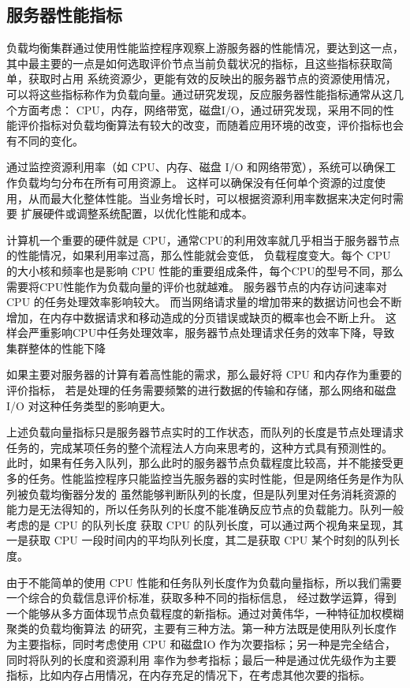 \subsection{服务器性能指标}

负载均衡集群通过使用性能监控程序观察上游服务器的性能情况，要达到这一点，其中最主要的一点是如何选取评价节点当前负载状况的指标，且这些指标获取简单，获取时占用
系统资源少，更能有效的反映出的服务器节点的资源使用情况，可以将这些指标称作为负载向量。通过研究发现，反应服务器性能指标通常从这几个方面考虑：
CPU，内存，网络带宽，磁盘I/O，通过研究发现，采用不同的性能评价指标对负载均衡算法有较大的改变，而随着应用环境的改变，评价指标也会有不同的变化。

通过监控资源利用率（如 CPU、内存、磁盘 I/O 和网络带宽），系统可以确保工作负载均匀分布在所有可用资源上。
这样可以确保没有任何单个资源的过度使用，从而最大化整体性能。当业务增长时，可以根据资源利用率数据来决定何时需要
扩展硬件或调整系统配置，以优化性能和成本。

计算机一个重要的硬件就是 CPU，通常CPU的利用效率就几乎相当于服务器节点的性能情况，如果利用率过高，那么性能就会变低，
负载程度变大。每个 CPU 的大小核和频率也是影响 CPU 性能的重要组成条件，每个CPU的型号不同，那么需要将CPU性能作为负载向量的评价也就越难。
服务器节点的内存访问速率对 CPU 的任务处理效率影响较大。
而当网络请求量的增加带来的数据访问也会不断增加，在内存中数据请求和移动造成的分页错误或缺页的概率也会不断上升。
这样会严重影响CPU中任务处理效率，服务器节点处理请求任务的效率下降，导致集群整体的性能下降

如果主要对服务器的计算有着高性能的需求，那么最好将 CPU 和内存作为重要的评价指标，
若是处理的任务需要频繁的进行数据的传输和存储，那么网络和磁盘 I/O 对这种任务类型的影响更大。

上述负载向量指标只是服务器节点实时的工作状态\cite{mahato2017scheduling}，而队列的长度是节点处理请求任务的，完成某项任务的整个流程法人方向来思考的，这种方式具有预测性的。
此时，如果有任务入队列，那么此时的服务器节点负载程度比较高，并不能接受更多的任务。性能监控程序只能监控当先服务器的实时性能，但是网络任务是作为队列被负载均衡器分发的
虽然能够判断队列的长度，但是队列里对任务消耗资源的能力是无法得知的，所以任务队列的长度不能准确反应节点的负载能力。队列一般考虑的是 CPU 的队列长度
获取 CPU 的队列长度，可以通过两个视角来呈现，其一是获取 CPU 一段时间内的平均队列长度，其二是获取 CPU 某个时刻的队列长度。

由于不能简单的使用 CPU 性能和任务队列长度作为负载向量指标，所以我们需要一个综合的负载信息评价标准，获取多种不同的指标信息，
经过数学运算，得到一个能够从多方面体现节点负载程度的新指标。通过对黄伟华，一种特征加权模糊聚类的负载均衡算法\cite{黄伟华2017一种特征加权模糊聚类的负载均衡算法}
的研究，主要有三种方法。第一种方法既是使用队列长度作为主要指标，同时考虑使用 CPU 和磁盘IO 作为次要指标；另一种是完全结合，同时将队列的长度和资源利用
率作为参考指标；最后一种是通过优先级作为主要指标，比如内存占用情况，在内存充足的情况下，在考虑其他次要的指标。

